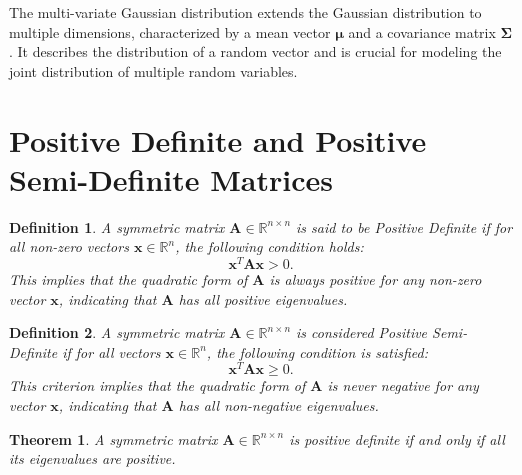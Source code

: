 \documentclass[11pt]{book} %
\newtheorem{theorem}{Theorem}[section]
\newtheorem{definition}{Definition}[section]
\begin{document}
The multi-variate Gaussian distribution extends the Gaussian distribution to multiple dimensions, characterized by a mean vector \(\boldsymbol{\mu}\) and a covariance matrix \(\boldsymbol{\Sigma}\). It describes the distribution of a random vector and is crucial for modeling the joint distribution of multiple random variables.


\section{Positive Definite and Positive Semi-Definite Matrices}


\begin{definition}
A symmetric matrix \(\mathbf{A} \in \mathbb{R}^{n \times n}\) is said to be \textit{Positive Definite} if for all non-zero vectors \(\mathbf{x} \in \mathbb{R}^n\), the following condition holds:
\begin{equation}
\mathbf{x}^T \mathbf{A} \mathbf{x} > 0.
\end{equation}
This implies that the quadratic form of \(\mathbf{A}\) is always positive for any non-zero vector \(\mathbf{x}\), indicating that \(\mathbf{A}\) has all positive eigenvalues.
\end{definition}

\begin{definition}
A symmetric matrix \(\mathbf{A} \in \mathbb{R}^{n \times n}\) is considered \textit{Positive Semi-Definite} if for all vectors \(\mathbf{x} \in \mathbb{R}^n\), the following condition is satisfied:
\begin{equation}
\mathbf{x}^T \mathbf{A} \mathbf{x} \geq 0.
\end{equation}
This criterion implies that the quadratic form of \(\mathbf{A}\) is never negative for any vector \(\mathbf{x}\), indicating that \(\mathbf{A}\) has all non-negative eigenvalues.
\end{definition}

\begin{theorem}
A symmetric matrix \(\mathbf{A} \in \mathbb{R}^{n \times n}\) is positive definite if and only if all its eigenvalues are positive.
\end{theorem}
\end{document}
